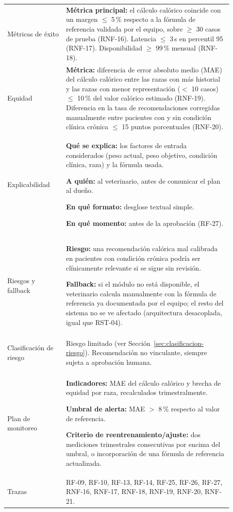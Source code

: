\begin{longtable}{@{}>{\bfseries\raggedright\arraybackslash}p{0.24\linewidth} >{\raggedright\arraybackslash}p{0.68\linewidth}@{}}
Métricas de éxito & \textbf{Métrica principal:} el cálculo calórico coincide con un margen $\leq$ 5\,\% respecto a la fórmula de referencia validada por el equipo, sobre $\geq$ 30 casos de prueba (RNF-16). Latencia $\leq$ 3\,s en percentil 95 (RNF-17). Disponibilidad $\geq$ 99\,\% mensual (RNF-18). \\[4pt]

Equidad & \textbf{Métrica:} diferencia de error absoluto medio (MAE) del cálculo calórico entre las razas con más historial y las razas con menor representación ($<$ 10 casos) $\leq$ 10\,\% del valor calórico estimado (RNF-19). Diferencia en la tasa de recomendaciones corregidas manualmente entre pacientes con y sin condición clínica crónica $\leq$ 15 puntos porcentuales (RNF-20). \\[4pt]

Explicabilidad & \textbf{Qué se explica:} los factores de entrada considerados (peso actual, peso objetivo, condición clínica, raza) y la fórmula usada.

\textbf{A quién:} al veterinario, antes de comunicar el plan al dueño.

\textbf{En qué formato:} desglose textual simple.

\textbf{En qué momento:} antes de la aprobación (RF-27). \\[4pt]

Riesgos y fallback & \textbf{Riesgo:} una recomendación calórica mal calibrada en pacientes con condición crónica podría ser clínicamente relevante si se sigue sin revisión.

\textbf{Fallback:} si el módulo no está disponible, el veterinario calcula manualmente con la fórmula de referencia ya documentada por el equipo; el resto del sistema no se ve afectado (arquitectura desacoplada, igual que RST-04). \\[4pt]

Clasificación de riesgo & Riesgo limitado (ver Sección~\ref{sec:clasificacion-riesgo}). Recomendación no vinculante, siempre sujeta a aprobación humana. \\[4pt]

Plan de monitoreo & \textbf{Indicadores:} MAE del cálculo calórico y brecha de equidad por raza, recalculados trimestralmente.

\textbf{Umbral de alerta:} MAE $>$ 8\,\% respecto al valor de referencia.

\textbf{Criterio de reentrenamiento/ajuste:} dos mediciones trimestrales consecutivas por encima del umbral, o incorporación de una fórmula de referencia actualizada. \\[4pt]

Trazas & RF-09, RF-10, RF-13, RF-14, RF-25, RF-26, RF-27, RNF-16, RNF-17, RNF-18, RNF-19, RNF-20, RNF-21. \\

\end{longtable}

